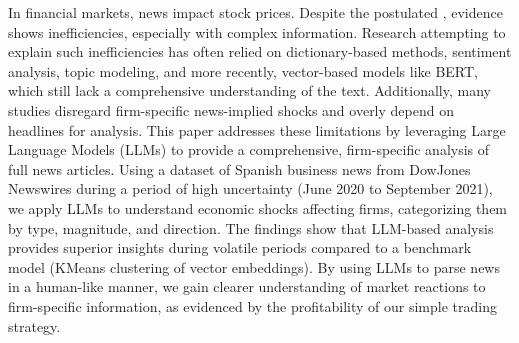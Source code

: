 In financial markets, news impact stock prices. Despite the postulated , evidence shows inefficiencies, especially with complex information. Research attempting to explain such inefficiencies has often relied on dictionary-based methods, sentiment analysis, topic modeling, and more recently, vector-based models like BERT, which still lack a comprehensive understanding of the text. Additionally, many studies disregard firm-specific news-implied shocks and overly depend on headlines for analysis. This paper addresses these limitations by leveraging Large Language Models (LLMs) to provide a comprehensive, firm-specific analysis of full news articles. 
Using a dataset of Spanish business news from DowJones Newswires during a period of high uncertainty (June 2020 to September 2021), we apply LLMs to understand economic shocks affecting firms, categorizing them by type, magnitude, and direction. The findings show that LLM-based analysis provides superior insights during volatile periods compared to a benchmark model (KMeans clustering of vector embeddings). By using LLMs to parse news in a human-like manner, we gain clearer understanding of market reactions to firm-specific information, as evidenced by the profitability of our simple trading strategy.

